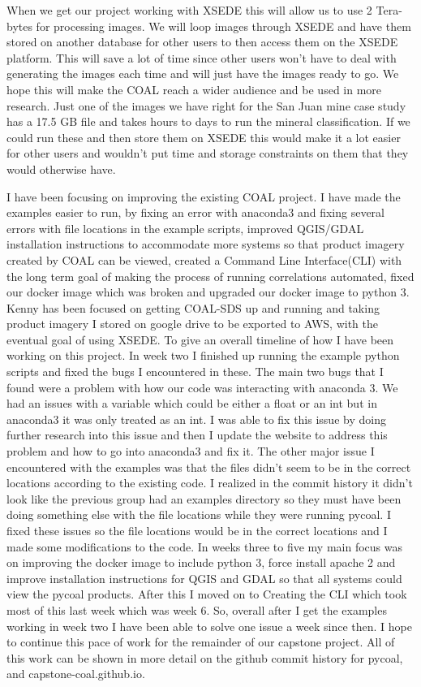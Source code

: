 \documentclass[onecolumn, draftclsnofoot,10pt, compsoc]{IEEEtran}
\begin{document}
When we get our project working with XSEDE this will allow us to use 2 Tera-bytes for processing images. We will loop images through XSEDE and have them stored on another database for other users to then access them on the XSEDE platform. This will save a lot of time since  other users won’t have to deal with generating the images each time and will just have the images ready to go. We hope this will make the COAL reach a wider audience and be used in more research. Just one of the images we have right for the San Juan mine case study has a 17.5 GB file and takes hours to days to run the mineral classification. If we could run these and then store them on XSEDE this would make it a lot easier for other users and wouldn’t put time and storage constraints on them that they would otherwise have.

I have been focusing on improving the existing COAL project. I have made the examples easier to run, by fixing an error with anaconda3 and fixing several errors with file locations in the example scripts, improved QGIS/GDAL installation instructions to accommodate more systems so that product imagery created by COAL can be viewed, created a Command Line Interface(CLI) with the long term goal of making the process of running correlations automated, fixed our docker image which was broken and upgraded our docker image to python 3.
Kenny has been focused on getting COAL-SDS up and running and taking product imagery I stored on google drive to be exported to AWS, with the eventual goal of using XSEDE.
To give an overall timeline of how I have been working on this project. In week two I finished up running the example python scripts and fixed the bugs I encountered in these. The main two bugs that I found were a problem with how our code was interacting with anaconda 3. We had an issues with a variable which could be either a float or an int but in anaconda3 it was only treated as an int. I was able to fix this issue by doing further research into this issue and then I update the website to address this problem and how to go into anaconda3 and fix it. The other major issue I encountered with the examples was that the files didn’t seem to be in the correct locations according to the existing code. I realized in the commit history it didn’t look like the previous group had an examples directory so they must have been doing something else with the file locations while they were running pycoal. I fixed these issues so the file locations would be in the correct locations and I made some modifications to the code. In weeks three to five my main focus was on improving the docker image to include python 3, force install apache 2 and improve installation instructions for QGIS and GDAL so that all systems could view the pycoal products. After this I moved on to Creating the CLI which took most of this last week which was week 6. So, overall after I get the examples working in week two I have been able to solve one issue a week since then. I hope to continue this pace of work for the remainder of our capstone project. All of this work can be shown in more detail on the github commit history for pycoal, and capstone-coal.github.io.
\end{document}
